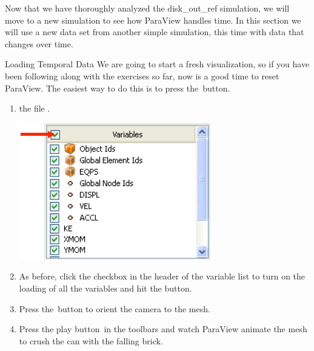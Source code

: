Now that we have thoroughly analyzed the disk\_out\_ref simulation, we will
move to a new simulation to see how ParaView handles time.  In this section
we will use a new data set from another simple simulation, this time with
data that changes over time.

\begin{exercise}{Loading Temporal Data}
  \label{ex:LoadingTemporalData}%
  We are going to start a fresh visualization, so if you have been
  following along with the exercises so far, now is a good time to reset
  ParaView.  The easiest way to do this is to press the~\disconnect button.

  \begin{enumerate}
  \item {} the file .
    \begin{inlinefig}
      \includegraphics[scale=\bbscale]{images/Variables_can}
    \end{inlinefig}
  \item As before, click the checkbox in the header of the variable list to
    turn on the loading of all the variables and hit the \apply button.
  \item Press the~\yPlus button to orient the camera to the mesh.
  \item Press the play button~\vcrPlay in the toolbars and watch ParaView
    animate the mesh to crush the can with the falling brick.
  \end{enumerate}


\end{exercise}
